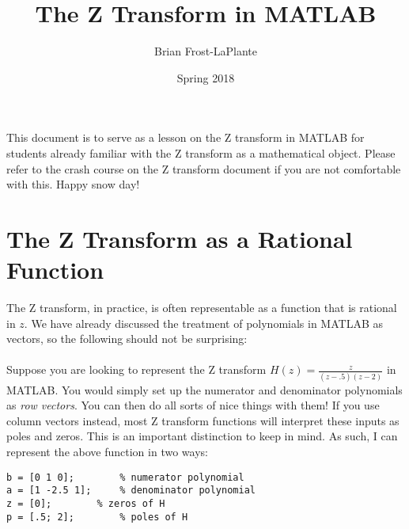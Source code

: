 \documentclass{article}
\title{The Z Transform in MATLAB}
\author{Brian Frost-LaPlante}
\date{Spring 2018}
\begin{document}
\maketitle
\noindent This document is to serve as a lesson on the Z transform in MATLAB for students already familiar with 
the Z transform as a mathematical object. Please refer to the crash course on the Z transform document if you 
are not comfortable with this. Happy snow day!

\section*{The Z Transform as a Rational Function}
\noindent The Z transform, in practice, is often representable as a function that is rational in $z$. We have 
already discussed the treatment of polynomials in MATLAB as vectors, so the following should not be surprising: \\ \\
\noindent Suppose you are looking to represent the Z transform $H(z) = \frac{z}{(z-.5)(z-2)}$ in MATLAB. You would simply set 
up the numerator and denominator polynomials as \textit{row vectors}. You can then do all sorts of nice things with them! 
If you use column vectors instead, most Z transform functions will interpret these inputs as poles and zeros. This is an 
important distinction to keep in mind. As such, I can represent the above function in two ways:

\begin{verbatim}
b = [0 1 0];		% numerator polynomial
a = [1 -2.5 1];  	% denominator polynomial
z = [0];		% zeros of H
p = [.5; 2]; 		% poles of H
\end{verbatim}
\end{document}
